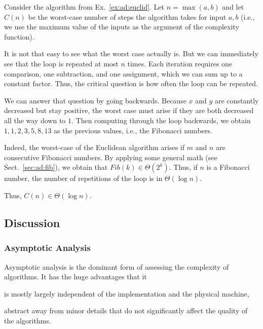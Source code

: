 \begin{example}\label{ex:ad:euclid:complex}
Consider the algorithm from Ex.~\ref{ex:ad:euclid}.
Let $n=\max(a,b)$ and let $C(n)$ be the worst-case number of steps the algorithm takes for input $a,b$ (i.e., we use the maximum value of the inputs as the argument of the complexity function).

It is not that easy to see what the worst case actually is.
But we can immediately see that the loop is repeated at most $n$ times.
Each iteration requires one comparison, one subtraction, and one assignment, which we can sum up to a constant factor.{\footnotemark}
Thus, the critical question is how often the loop can be repeated.

We can answer that question by going backwards.
Because $x$ and $y$ are constantly decreased but stay positive, the worst case must arise if they are both decreased all the way down to $1$.
Then computing through the loop backwards, we obtain $1,1,2,3,5,8,13$ as the previous values, i.e., the Fibonacci numbers.

Indeed, the worst-case of the Euclidean algorithm arises if $m$ and $n$ are consecutive Fibonacci numbers.
By applying some general math (see Sect.~\ref{sec:ad:fib}), we obtain that $Fib(k)\in\Theta(2^k)$.
Thus, if $n$ is a Fibonacci number, the number of repetitions of the loop is in $\Theta(\log n)$.

Thus, $C(n)\in \Theta(\log n)$.
\end{example}

\subsection{Discussion}

\subsubsection{Asymptotic Analysis}

Asymptotic analysis is the dominant form of assessing the complexity of algorithms.
It has the huge advantages that it
\begin{compactitem}
 \item is mostly largely independent of the implementation and the physical machine,
 \item abstract away from minor details that do not significantly affect the quality of the algorithms.
\end{compactitem}

